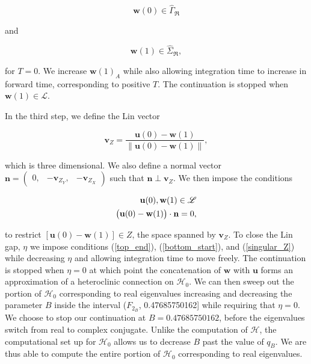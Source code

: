 \documentclass{ws-ijbc}
\begin{document}
\begin{equation}
	\mathbf{w}(0) \in \widehat{\Gamma}_{\Re}
	\label{bottom_start}
\end{equation}

and

\begin{equation}
	\mathbf{w}(1) \in \widehat{\Sigma}_{\Re},
\end{equation}

\noindent
for $T=0$.  We increase $\mathbf{w}(1)_A$ while also allowing integration time to increase in forward time, corresponding to positive $T$.  The continuation is stopped when $\mathbf{w}(1) \in \mathscr{L}$.

In the third step, we define the Lin vector 

\begin{equation}
	\mathbf{v}_Z = \frac{\mathbf{u}(0) - \mathbf{w}(1)}{\left\lVert \mathbf{u}(0) - \mathbf{w}(1) \right\lVert},
	\label{Lin_vector_singular}
\end{equation}

\noindent
which is three dimensional.  We also define a normal vector $\mathbf{n} = \begin{pmatrix} 0, & -\mathbf{v}_{Z_Y}, &-\mathbf{v}_{Z_X} \end{pmatrix}$ such that $\mathbf{n} \perp \mathbf{v}_Z$.  We then impose the conditions 

\begin{align}
	\begin{split}
		\mathbf{u}(0), \mathbf{w}(1) \in \mathscr{L} \\ \vspace{2mm}
		\begin{pmatrix}\mathbf{u}(0) - \mathbf{w}(1)\end{pmatrix} \cdot \mathbf{n} =0,
	\end{split}
	\label{singular_Z}
\end{align}

\noindent
to restrict $[ \mathbf{u}(0)-\mathbf{w}(1)] \in Z$, the space spanned by $\mathbf{v}_Z$.  To close the Lin gap, $\eta$ we impose conditions (\ref{top_end}), (\ref{bottom_start}), and (\ref{singular_Z}) while decreasing $\eta$ and allowing integration time to move freely.  The continuation is stopped when $\eta = 0$ at which point the concatenation of $\mathbf{w}$ with $\mathbf{u}$ forms an approximation of a heteroclinic connection on $\mathscr{H}_0$.  We can then sweep out the portion of $\mathscr{H}_0$ corresponding to real eigenvalues increasing and decreasing the parameter $B$ inside the interval ($F_{2_B}$, 0.47685750162] while requiring that $\eta=0$.  We choose to stop our continuation at $B = 0.47685750162$, before the eigenvalues switch from real to complex conjugate.  Unlike the computation of $\mathscr{H}$, the computational set up for $\mathscr{H}_0$ allows us to decrease $B$ past the value of $q_B$.  We are thus able to compute the entire portion of $\mathscr{H}_0$ corresponding to real eigenvalues.
\end{document}
